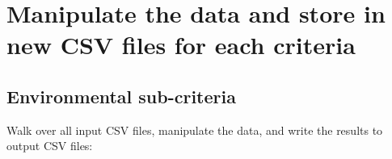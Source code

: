 \documentclass[
]{article}
\begin{document}
\hypertarget{manipulate-the-data-and-store-in-new-csv-files-for-each-criteria}{%
\section{Manipulate the data and store in new CSV files for each
criteria}\label{manipulate-the-data-and-store-in-new-csv-files-for-each-criteria}}

\hypertarget{environmental-sub-criteria}{%
\subsection{Environmental
sub-criteria}\label{environmental-sub-criteria}}

Walk over all input CSV files, manipulate the data, and write the
results to output CSV files:
\end{document}
